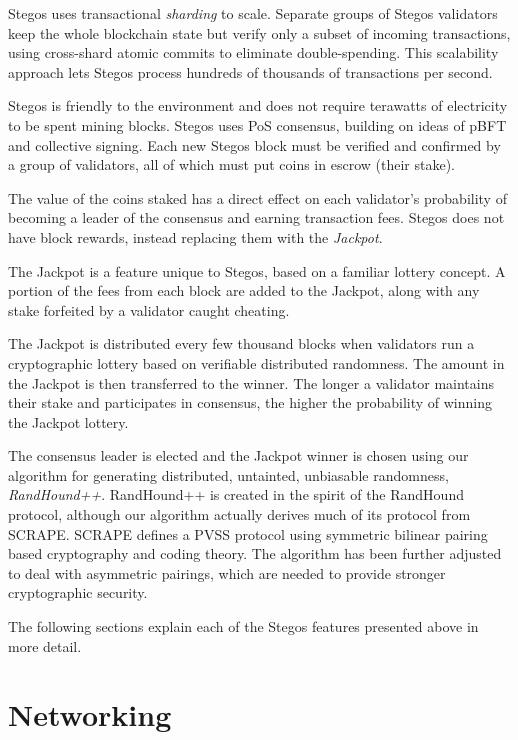 \documentclass[a4paper, 10pt, conference]{ieeeconf}
\begin{document}
Stegos uses transactional \textit{sharding} to scale. Separate groups of Stegos validators keep the whole blockchain state but verify only a subset of incoming transactions, using cross-shard atomic commits to eliminate double-spending. This scalability approach lets Stegos process hundreds of thousands of transactions per second.

Stegos is friendly to the environment and does not require terawatts of electricity to be spent mining blocks. Stegos uses PoS consensus, building on ideas of pBFT\cite{c9} and collective signing\cite{c10}\cite{c11}. Each new Stegos block must be verified and confirmed by a group of validators, all of which must put coins in escrow (their stake).

The value of the coins staked has a direct effect on each validator's probability of becoming a leader of the consensus and earning transaction fees. Stegos does not have block rewards, instead replacing them with the \textit{Jackpot}.

The Jackpot is a feature unique to Stegos, based on a familiar lottery concept. A portion of the fees from each block are added to the Jackpot, along with any stake forfeited by a validator caught cheating.

The Jackpot is distributed every few thousand blocks when validators run a cryptographic lottery based on verifiable distributed randomness. The amount in the Jackpot is then transferred to the winner. The longer a validator maintains their stake and participates in consensus, the higher the probability of winning the Jackpot lottery.

The consensus leader is elected and the Jackpot winner is chosen using our algorithm for generating distributed, untainted, unbiasable randomness, \textit{RandHound++}. RandHound++ is created in the spirit of the RandHound protocol\cite{c12}, although our algorithm actually derives much of its protocol from SCRAPE\cite{c13}. SCRAPE defines a PVSS\cite{c14} protocol using symmetric bilinear pairing based cryptography and coding theory. The algorithm has been further adjusted to deal with asymmetric pairings, which are needed to provide stronger cryptographic security.

The following sections explain each of the Stegos features presented above in more detail.

\section{Networking}\label{networking}
\end{document}
